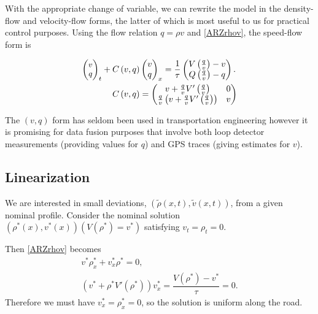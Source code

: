 \documentclass[a4paper, 10pt, conference]{ieeeconf}      %
\begin{document}
With the appropriate change of variable, we can rewrite the model in the density-flow and velocity-flow forms, the latter of which is most useful to us for practical control purposes. Using the flow relation $q = \rho v$ and \eqref{ARZrhov}, the speed-flow form is

{\footnotesize
\begin{subequations}
\begin{align}
\footnotesize
\begin{pmatrix}
	v \\ 
	q
\end{pmatrix}_t
+ C\left(v, q\right)&
\begin{pmatrix}
	v \\ 
	q
\end{pmatrix}_x 
=
\dfrac{1}{\tau}
\begin{pmatrix}
	V\left( \frac{q}{v}\right) - v \\
	Q\left( \frac{q}{v}\right) - q
\end{pmatrix}. \label{ARZvq} \\
C\left(v, q \right)
&=
\begin{pmatrix}
	v + \frac{q}{v} V'\left( \frac{q}{v} \right) & 0 \\
	\frac{q}{v} \left( v + \frac{q}{v} V'\left( \frac{q}{v} \right) \right) & v
\end{pmatrix}
\end{align}
\end{subequations}
}

The $\left(v, q \right)$ form has seldom been used in transportation engineering however it is promising for data fusion purposes that involve both loop detector measurements (providing values for $q$) and GPS traces (giving estimates for $v$).


\subsection{Linearization}
We are interested in small deviations, $(\tilde{\rho}(x,t), \tilde{v}(x,t))$, from a given nominal profile. Consider the nominal solution $(\rho^*(x),v^*(x))(V(\rho^*) = v^*)$ satisfying $v_t = \rho_t = 0$. 

Then \eqref{ARZrhov} becomes
{\footnotesize
\begin{align}
v^* \rho^*_x + v^*_x\rho^* = 0, \\
( v^* + \rho^* V'( \rho^*) )v^*_x = \dfrac{V(\rho^*) - v^*}{\tau} = 0.
\end{align}
}
Therefore we must have $v^*_x=\rho^*_x=0$, so the solution is uniform along the road. 
\end{document}
